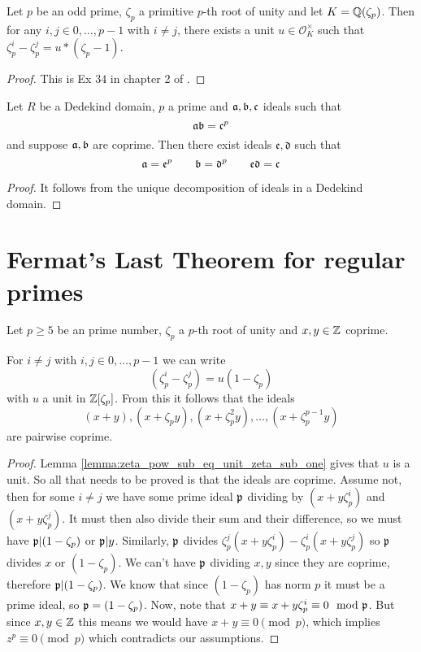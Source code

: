\begin{lemma}\label{lemma:zeta_pow_sub_eq_unit_zeta_sub_one}
	\leanok
Let $p$ be an odd prime, $\zeta_p$ a primitive $p$-th root of unity and let $K=\mathbb{Q}(\zeta_p)$. Then for any $i,j \in {0,\dots,p-1}$ with $i \ne j$, there exists a unit $u \in \mathcal{O}_K^\times$ such that $\zeta_p^i-\zeta_p^j = u * (\zeta_p-1)$.
\end{lemma}
\begin{proof}
	\leanok
	This is Ex $34$ in chapter 2 of \cite{marcus}.
\end{proof}


\begin{lemma}\label{lemma:ideals_mult_to_power}
    \leanok
	Let $R$ be a Dedekind domain, $p$ a prime and $\mathfrak{a},\mathfrak{b},\mathfrak{c}$ ideals such that \[\mathfrak{a}\mathfrak{b}=\mathfrak{c}^p\] and suppose $\mathfrak{a},\mathfrak{b}$ are coprime. Then there exist ideals $\mathfrak{e},\mathfrak{d}$ such that \[\mathfrak{a}=\mathfrak{e}^p \qquad \mathfrak{b}=\mathfrak{d}^p \qquad \mathfrak{e}\mathfrak{d}=\mathfrak{c}\]
\end{lemma}
\begin{proof}
 \leanok
 It follows from the unique decomposition of ideals in a Dedekind domain.
\end{proof}


\section{Fermat's Last Theorem for regular primes}

\begin{lemma}\label{lem:flt_ideals_coprime}
	\leanok
	Let $p \geq 5$ be an prime number, $\zeta_p$ a $p$-th root of unity and $x, y \in \mathbb{Z}$ coprime.

	 For $i \neq j$ with $i,j \in {0,\dots,p-1}$ we can write \[(\zeta_p^i-\zeta_p^j)=u(1-\zeta_p)\] with $u$ a unit in $\mathbb{Z}[\zeta_p]$. From this it follows that the ideals \[(x+y),(x+\zeta_py),(x+\zeta_p^2y),\dots,(x+\zeta_p^{p-1}y)\] are pairwise coprime.
\end{lemma}
\begin{proof}
	 Lemma \ref{lemma:zeta_pow_sub_eq_unit_zeta_sub_one} gives that $u$ is a unit. So all that needs to be proved is that the ideals are coprime. Assume not, then for some $i \neq j$ we have some prime ideal $\mathfrak{p}$ dividing by $(x+y\zeta_p^i)$ and $(x+y\zeta_p^j)$. It must then also divide their sum and their difference, so we must have $\mathfrak{p} | (1-\zeta_p)$ or $\mathfrak{p} | y$. Similarly, $\mathfrak{p}$ divides $\zeta_p^j(x+y\zeta_p^i)-\zeta_p^i(x+y\zeta_p^j)$ so $\mathfrak{p}$ divides $x$ or $(1-\zeta_p)$. We can't have $\mathfrak{p}$ dividing $x,y$ since they are coprime, therefore $\mathfrak{p} |(1-\zeta_p)$. We know that since $(1-\zeta_p)$ has norm $p$ it must be a prime ideal, so $\mathfrak{p}=(1-\zeta_p)$. Now, note that $x+y \equiv x+y\zeta_p^i \equiv 0 \mod {\mathfrak{p}}$. But since $x,y \in \mathbb{Z}$ this means we would have $x+y \equiv 0 \pmod p$, which implies $z^p \equiv 0 \pmod p$ which contradicts our assumptions.
\end{proof}

